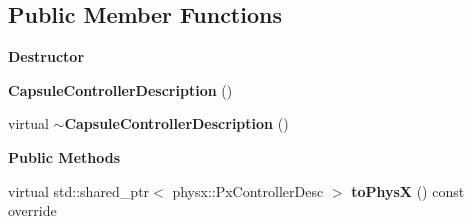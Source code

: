 \subsection*{Public Member Functions}
\begin{Indent}\textbf{ Destructor}\par
\begin{DoxyCompactItemize}
\item 
\mbox{\label{classrev_1_1_capsule_controller_description_a3afbcd8b5e42fe09548a87cac3750fd7}} 
{\bfseries Capsule\+Controller\+Description} ()
\item 
\mbox{\label{classrev_1_1_capsule_controller_description_a2795c0ce5be5e4df421536c87927cd51}} 
virtual {\bfseries $\sim$\+Capsule\+Controller\+Description} ()
\end{DoxyCompactItemize}
\end{Indent}
\begin{Indent}\textbf{ Public Methods}\par
\begin{DoxyCompactItemize}
\item 
\mbox{\label{classrev_1_1_capsule_controller_description_a485765e643aa0a7b1e5337396a853f62}} 
virtual std\+::shared\+\_\+ptr$<$ physx\+::\+Px\+Controller\+Desc $>$ {\bfseries to\+PhysX} () const override
\end{DoxyCompactItemize}
\end{Indent}
